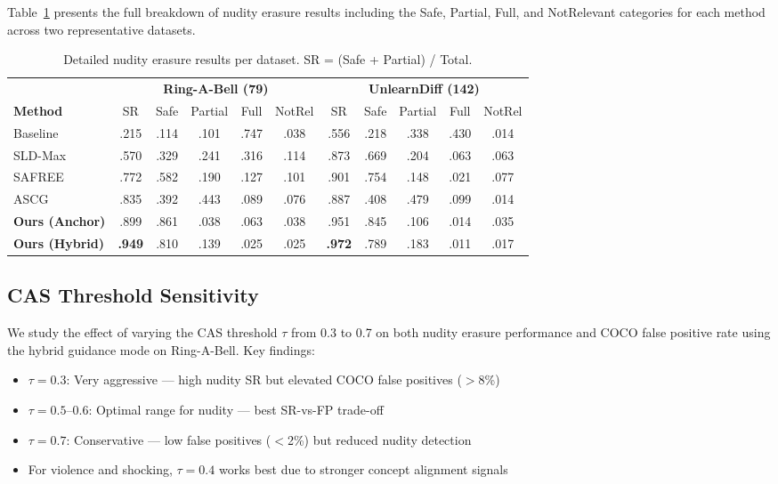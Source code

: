 Table~\ref{table:detailed_nudity} presents the full breakdown of nudity erasure results including the Safe, Partial, Full, and NotRelevant categories for each method across two representative datasets.

\begin{table}[h]
\centering
\caption{Detailed nudity erasure results per dataset. SR = (Safe + Partial) / Total.}
\label{table:detailed_nudity}
\small
\renewcommand{\arraystretch}{1.1}
\setlength{\tabcolsep}{0.4em}
\begin{tabular}{@{}l ccccc ccccc@{}}
\toprule
& \multicolumn{5}{c}{\textbf{Ring-A-Bell (79)}} & \multicolumn{5}{c}{\textbf{UnlearnDiff (142)}} \\
\cmidrule(lr){2-6} \cmidrule(lr){7-11}
\textbf{Method} & SR & Safe & Partial & Full & NotRel & SR & Safe & Partial & Full & NotRel \\
\midrule
Baseline & .215 & .114 & .101 & .747 & .038 & .556 & .218 & .338 & .430 & .014 \\
SLD-Max & .570 & .329 & .241 & .316 & .114 & .873 & .669 & .204 & .063 & .063 \\
SAFREE & .772 & .582 & .190 & .127 & .101 & .901 & .754 & .148 & .021 & .077 \\
ASCG & .835 & .392 & .443 & .089 & .076 & .887 & .408 & .479 & .099 & .014 \\
\midrule
\textbf{Ours (Anchor)} & .899 & .861 & .038 & .063 & .038 & .951 & .845 & .106 & .014 & .035 \\
\textbf{Ours (Hybrid)} & \textbf{.949} & .810 & .139 & .025 & .025 & \textbf{.972} & .789 & .183 & .011 & .017 \\
\bottomrule
\end{tabular}
\end{table}

\subsection{CAS Threshold Sensitivity}
\label{app:cas_threshold}

We study the effect of varying the CAS threshold $\tau$ from 0.3 to 0.7 on both nudity erasure performance and COCO false positive rate using the hybrid guidance mode on Ring-A-Bell. Key findings:

\begin{itemize}[leftmargin=1.5em,itemsep=2pt]
    \item $\tau = 0.3$: Very aggressive --- high nudity SR but elevated COCO false positives ($>$8\%)
    \item $\tau = 0.5$--$0.6$: Optimal range for nudity --- best SR-vs-FP trade-off
    \item $\tau = 0.7$: Conservative --- low false positives ($<$2\%) but reduced nudity detection
    \item For violence and shocking, $\tau = 0.4$ works best due to stronger concept alignment signals
\end{itemize}

